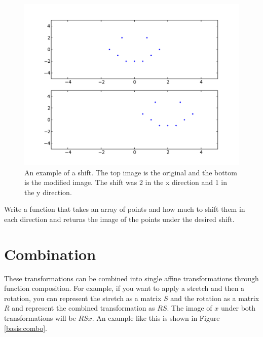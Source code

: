 \begin{figure}[H]
\includegraphics[scale = .5]{shift.pdf}
\caption{
An example of a shift.
The top image is the original and the bottom is the modified image.
The shift was 2 in the x direction and 1 in the y direction.}
\end{figure}

\begin{problem}
Write a function that takes an array of points and how much to shift them in each direction and returns the image of the points under the desired shift.
\end{problem}

\section*{Combination}
These transformations can be combined into single affine transformations through function composition.
For example, if you want to apply a stretch and then a rotation, you can represent the stretch as a matrix $S$ and the rotation as a matrix $R$ and represent the combined transformation as $R S$.
The image of $x$ under both transformations will be $R S x$.
An example like this is shown in Figure \ref{basis:combo}.


